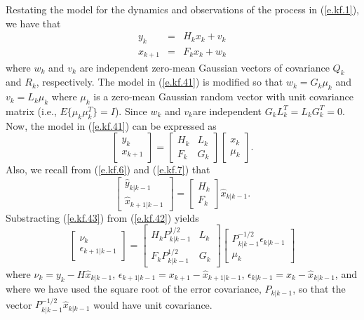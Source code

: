	Restating the model for the dynamics and
observations of the process in (\ref{e.kf.1}), we have that
%
\begin{eqnarray}
y_k&=&H_kx_k+v_k\nonumber\\
x_{k+1}&=&F_kx_k+w_k
\label{e.kf.41}
\end{eqnarray}
%
where $w_k$ and $v_k$ are independent zero-mean Gaussian
vectors of covariance $Q_k$ and $R_k$, respectively.
The model in (\ref{e.kf.41}) is modified so that
$w_k=G_k\mu_k$ and $v_k=L_k\mu_k$ where $\mu_k$ is
a zero-mean Gaussian random vector with 
unit covariance matrix (i.e., $E\{\mu_k\mu_k^T\}=I$).  Since $w_k$ and
$v_k$are independent $G_kL_k^T=L_kG_k^T=0.$
Now, the model in (\ref{e.kf.41}) can be expressed as
%
\begin{equation}
\left[\begin{array}{c}y_k\\x_{k+1}\end{array}\right]
=
  \left[\begin{array}{cc}H_k&L_k\\
                         F_k&G_k\end{array}\right]
           \left[\begin{array}{c}x_k\\\mu_k\end{array}\right].
\label{e.kf.42}
\end{equation}
%
Also, we recall from (\ref{e.kf.6}) and (\ref{e.kf.7}) that
%
\begin{equation}
\left[\begin{array}{c}\hat{y}_{k|k-1}\\\hat{x}_{k+1|k-1}\end{array}\right]
=
           \left[\begin{array}{c}H_k\\F_k\end{array}\right]\hat{x}_{k|k-1}.
\label{e.kf.43}
\end{equation}
%
Substracting (\ref{e.kf.43}) from (\ref{e.kf.42}) yields
%
\begin{equation}
\left[\begin{array}{c}\nu_k\\\epsilon_{k+1|k-1}\end{array}\right]
=
  \left[\begin{array}{cc}H_kP_{k|k-1}^{1/2}&L_k\\
                         F_kP_{k|k-1}^{1/2}&G_k\end{array}\right]
\left[\begin{array}{c}P_{k|k-1}^{-1/2}\epsilon_{k|k-1}\\\mu_k\end{array}\right]
\label{e.kf.44}
\end{equation}
%
where $\nu_k=y_k-H\hat{x}_{k|k-1}$, $\epsilon_{k+1|k-1}=x_{k+1}-\hat{x}_
{k+1|k-1}$, $\epsilon_{k|k-1}=x_k-\hat{x}_{k|k-1}$, and
where we have used the square root of the error 
covariance, $P_{k|k-1}$, so that the vector $P_{k|k-1}^{-1/2}\hat{x}_{k|k-1}$
would have unit covariance.

